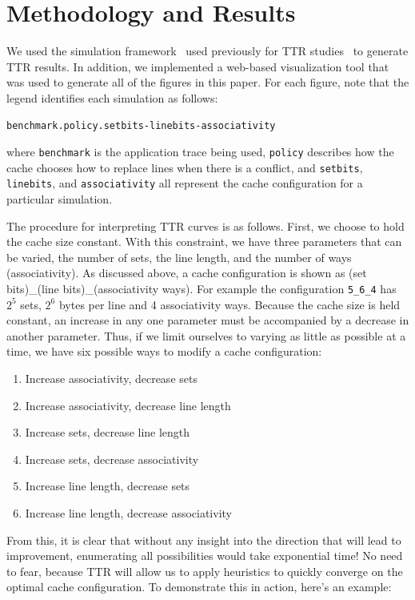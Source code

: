 
\section{Methodology and Results}
We used the simulation framework~\cite{spock13} used previously for TTR studies~\cite{carterkorbel13} to generate TTR results. 
In addition, we implemented a web-based visualization tool that was used to generate all of the figures in this paper.
For each figure, note that the legend identifies each simulation as follows:
\begin{verbatim}
benchmark.policy.setbits-linebits-associativity
\end{verbatim}
where \texttt{benchmark} is the application trace being used, 
\texttt{policy} describes how the cache chooses how to replace lines when there is a conflict, 
and \texttt{setbits}, \texttt{linebits}, and \texttt{associativity} all represent the cache configuration for a particular simulation.

The procedure for interpreting TTR curves is as follows. First, we choose to hold the cache size constant. With this constraint, we have three parameters that can be varied, the number of sets, the line length, and the number of ways (associativity). As discussed above, a cache configuration is shown as (set bits)\_(line bits)\_(associativity ways). 
For example the configuration \texttt{5\_6\_4} has $2^5$ sets, $2^6$ bytes per line and 4 associativity ways. 
Because the cache size is held constant, an increase in any one parameter must be accompanied by a decrease in another parameter. 
Thus, if we limit ourselves to varying as little as possible at a time, we have six possible ways to modify a cache configuration:

\begin{enumerate}
\item Increase associativity, decrease sets
\item Increase associativity, decrease line length
\item Increase sets, decrease line length
\item Increase sets, decrease associativity
\item Increase line length, decrease sets
\item Increase line length, decrease associativity
\end{enumerate}

From this, it is clear that without any insight into the direction that will lead to improvement, enumerating all possibilities would take exponential time! No need to fear, because TTR will allow us to apply heuristics to quickly converge on the optimal cache configuration. To demonstrate this in action, here's an example:

